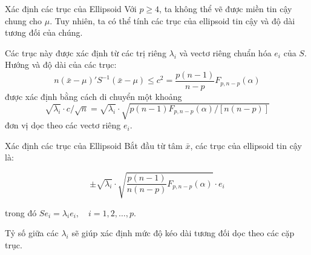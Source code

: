 \begin{frame}{Xác định các trục của Ellipsoid}
    Với $p \ge 4$, ta không thể vẽ được miền tin cậy chung cho $\mu$. Tuy nhiên, ta có thể tính các trục của ellipsoid tin cậy và độ dài tương đối của chúng. 
    
    \vspace{0.3cm}
    Các trục này được xác định từ các trị riêng $\lambda_i$ và vectơ riêng chuẩn hóa $e_i$ của $S$. Hướng và độ dài của các trục:
    \[
        n(\bar{x} - \mu)'S^{-1}(\bar{x} - \mu) \le c^2 = \frac{p(n - 1)}{n - p} F_{p, n-p}(\alpha) \tag{$*2$}
    \]
    được xác định bằng cách di chuyển một khoảng
    \[
        \sqrt{\lambda_i} \cdot c / \sqrt{n} = \sqrt{\lambda_i} \cdot \sqrt{p(n - 1) F_{p, n-p}(\alpha) / [n(n - p)]}
    \]
    đơn vị dọc theo các vectơ riêng $e_i$.
\end{frame}

\begin{frame}{Xác định các trục của Ellipsoid}
    Bắt đầu từ tâm $\bar{x}$, các trục của ellipsoid tin cậy là:
    \begin{block}{}
        \[
            \pm \sqrt{\lambda_i} \cdot \sqrt{\frac{p(n - 1)}{n(n - p)} F_{p, n-p}(\alpha)} \cdot e_i \tag{5-19}
        \]
    \end{block}
    trong đó $S e_i = \lambda_i e_i, \quad i = 1, 2, \dots, p$.

    \vspace{0.3cm}
    Tỷ số giữa các $\lambda_i$ sẽ giúp xác định mức độ kéo dài tương đối dọc theo các cặp trục.
\end{frame}

